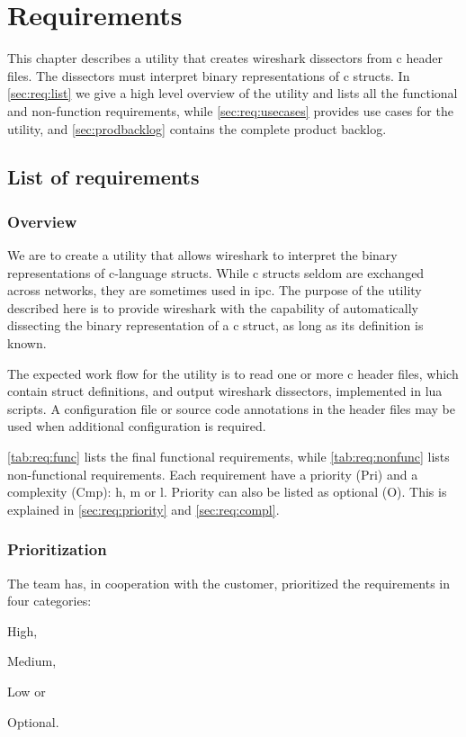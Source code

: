 \chapter{Requirements}
\label{chap:req:requirements}
This chapter describes a \gls{utility} that creates \Gls{wireshark} \glspl{dissector} from \Gls{c}
\gls{header} files. The \glspl{dissector} must interpret \gls{binary} representations of \Gls{c}
\glspl{struct}. In \autoref{sec:req:list} we give a high level overview of the
\gls{utility} and lists all the functional and non-function requirements, 
while \autoref{sec:req:usecases} provides use cases for the \gls{utility}, 
and \autoref{sec:prodbacklog} contains the complete product backlog.

\section{List of requirements}
\label{sec:req:list}

\subsection{Overview}
We are to create a \gls{utility} that allows \Gls{wireshark} to interpret the \gls{binary}
representations of \Gls{c}-language \glspl{struct}. While \Gls{c} \glspl{struct} seldom are exchanged
across networks, they are sometimes used in \gls{ipc}. The
purpose of the \gls{utility} described here is to provide \Gls{wireshark} with the
capability of automatically dissecting the \gls{binary} representation of a \Gls{c} \gls{struct},
as long as its definition is known.

The expected work flow for the \gls{utility} is to read one or more \Gls{c} \gls{header} files,
which contain \gls{struct} definitions, and output \Gls{wireshark} \glspl{dissector}, implemented
in \Gls{lua} scripts. A configuration file or source code annotations in the \gls{header}
files may be used when additional configuration is required.

\autoref{tab:req:func} lists the final functional requirements,
while \autoref{tab:req:nonfunc} lists non-functional requirements.
Each requirement have a priority (Pri) and a complexity (Cmp): \Gls{h}, 
\Gls{m} or \Gls{l}. Priority can also be listed as optional (O). This is
explained in \autoref{sec:req:priority} and \autoref{sec:req:compl}.

\subsection{Prioritization}
\label{sec:req:priority}
The team has, in cooperation with the customer, prioritized the requirements
in four categories:
\begin{inparaenum}
	\item High,
	\item Medium,
	\item Low or
	\item Optional.
\end{inparaenum} 

